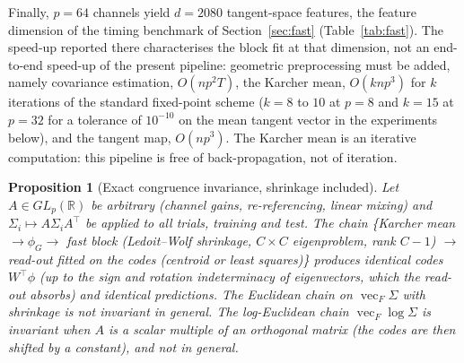 \documentclass[11pt,a4paper]{article}
\theoremstyle{plain}
\newtheorem{proposition}{Proposition}
\theoremstyle{definition}
\theoremstyle{remark}
\newcommand{\R}{\mathbb R}
\newcommand{\vecop}{\operatorname{vec}}
\newcommand{\T}{\top}
\begin{document}
Finally, $p=64$ channels yield $d=2080$ tangent-space features, the
feature dimension of the timing benchmark of Section~\ref{sec:fast}
(Table~\ref{tab:fast}). The speed-up reported there characterises the
block fit at that dimension, not an end-to-end speed-up of the present
pipeline: geometric preprocessing must be added, namely covariance
estimation, $O(np^2T)$, the Karcher mean, $O(knp^3)$ for $k$ iterations of
the standard fixed-point scheme ($k=8$ to $10$ at $p=8$ and $k=15$ at $p=32$
for a tolerance of $10^{-10}$ on the mean tangent vector in the experiments
below), and the tangent map, $O(np^3)$. The Karcher mean is an iterative
computation: this pipeline is free of back-propagation, not of iteration.

\begin{proposition}[Exact congruence invariance, shrinkage included]
\label{prop:congruence}
Let $A\in GL_p(\R)$ be arbitrary (channel gains, re-referencing, linear
mixing) and $\Sigma_i\mapsto A\Sigma_iA^\T$ be applied to \emph{all} trials,
training and test. The chain \{Karcher mean $\to\phi_G\to$ fast block
(Ledoit--Wolf shrinkage, $C\times C$ eigenproblem, rank $C-1$) $\to$
read-out fitted on the codes (centroid or least squares)\} produces
\emph{identical} codes $W^\T\phi$ (up to the
sign and rotation indeterminacy of eigenvectors, which the read-out absorbs)
and identical predictions. The Euclidean chain on $\vecop_F\Sigma$ with
shrinkage is not invariant in general. The log-Euclidean chain
$\vecop_F\log\Sigma$ is invariant when $A$ is a scalar multiple of an
orthogonal matrix (the codes are then shifted by a constant), and not in
general.
\end{proposition}
\end{document}
